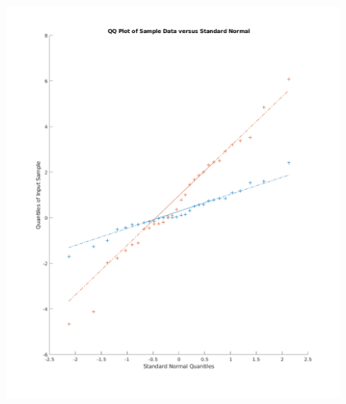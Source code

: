 \documentclass[aspectratio=169,10pt,t]{beamer}
\begin{document}
\begin{frame}[t]
\begin{columns}
\begin{column}{0.5\textwidth}
\begin{figure}[H]
                \includegraphics[scale=0.2]{images/qq.png}
            \end{figure}    
        \end{column}
    \end{columns}

\end{frame}
\end{document}
